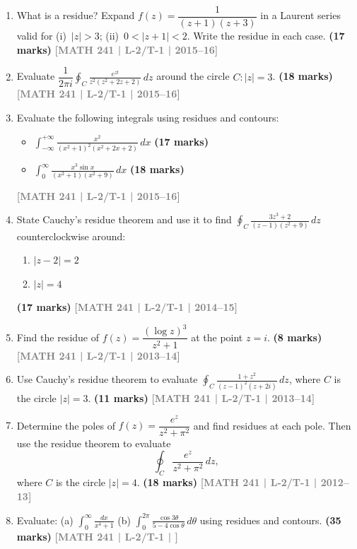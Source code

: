 \documentclass[12pt]{article}
\newcommand{\yr}[1]{\hfill\textcolor{gray}{\small\textbf{[#1]}}}
\newcommand{\mk}[1]{\textcolor{orange!70!black}{\small\textbf{(#1 marks)}}}
\begin{document}
\begin{enumerate}
\item What is a residue? Expand $f(z)=\dfrac{1}{(z+1)(z+3)}$ in a Laurent series valid for (i)~$|z|>3$; (ii)~$0<|z+1|<2$. Write the residue in each case.
\mk{17} \yr{MATH 241 | L-2/T-1 | 2015--16}



\item Evaluate $\dfrac{1}{2\pi i}\displaystyle\oint_{C}\frac{e^{zt}}{z^{2}(z^{2}+2z+2)}\,dz$ around the circle $C:|z|=3$.
\mk{18} \yr{MATH 241 | L-2/T-1 | 2015--16}



\item Evaluate the following integrals using residues and contours:

\begin{itemize}
    \item[(a)] $\displaystyle \int_{-\infty}^{+\infty} \frac{x^2}{(x^2 + 1)^2 (x^2 + 2x + 2)} \, dx$
\mk{17}  
    
    \item[(b)] $\displaystyle \int_{0}^{\infty} \frac{x^3 \sin x}{(x^2 + 1)(x^2 + 9)} \, dx$
    \mk{18}
\end{itemize} 
\yr{MATH 241 | L-2/T-1 | 2015--16}



\item State Cauchy's residue theorem and use it to find $\displaystyle\oint_{C}\frac{3z^{3}+2}{(z-1)(z^{2}+9)}\,dz$ counterclockwise around:
\begin{enumerate}
  \item $|z-2|=2$
  \item $|z|=4$
\end{enumerate}
\mk{17} \yr{MATH 241 | L-2/T-1 | 2014--15}



\item Find the residue of $f(z)=\dfrac{(\log z)^{3}}{z^{2}+1}$ at the point $z=i$.
\mk{8} \yr{MATH 241 | L-2/T-1 | 2013--14}



\item Use Cauchy's residue theorem to evaluate $\displaystyle\oint_{C}\frac{1+z^{2}}{(z-1)^{2}(z+2i)}\,dz$, where $C$ is the circle $|z|=3$.
\mk{11} \yr{MATH 241 | L-2/T-1 | 2013--14}



\item Determine the poles of $f(z)=\dfrac{e^{z}}{z^{2}+\pi^{2}}$ and find residues at each pole. Then use the residue theorem to evaluate
\[
\oint_{C} \frac{e^{z}}{z^{2}+\pi^{2}}\,dz,
\]
where $C$ is the circle $|z|=4$.
\mk{18} \yr{MATH 241 | L-2/T-1 | 2012--13}



\item Evaluate: (a) $\displaystyle\int_{0}^{\infty}\frac{dx}{x^{4}+1}$ \quad (b) $\displaystyle\int_{0}^{2\pi}\frac{\cos 3\theta}{5-4\cos\theta}\,d\theta$ using residues and contours.
\mk{35} \yr{MATH 241 | L-2/T-1 | }



\end{enumerate}
\end{document}
